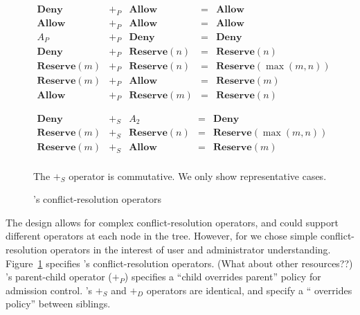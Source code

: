 \begin{figure}[t]
\begin{small}
\begin{displaymath}
\begin{array}{lclcl}
\textbf{Deny} & +_P & \textbf{Allow} & = & \textbf{Allow} \\
\textbf{Allow} & +_P & \textbf{Allow} & = & \textbf{Allow} \\
A_P & +_P & \textbf{Deny} & = & \textbf{Deny} \\
\textbf{Deny} & +_P & \textbf{Reserve}(n) & = & \textbf{Reserve}(n) \\
\textbf{Reserve}(m) & +_P & \textbf{Reserve}(n) & = & \textbf{Reserve}(\max(m,n)) \\
\textbf{Reserve}(m) & +_P & \textbf{Allow} & = & \textbf{Reserve}(m) \\
\textbf{Allow} & +_P & \textbf{Reserve}(m) & = & \textbf{Reserve}(n)
\end{array}
\end{displaymath}

\begin{displaymath}
\begin{array}{lclcl}
\textbf{Deny} & +_S & A_2 & = & \textbf{Deny} \\
\textbf{Reserve}(m) & +_S & \textbf{Reserve}(n) & = & \textbf{Reserve}(\max(m,n)) \\
\textbf{Reserve}(m) & +_S & \textbf{Allow} & = & \textbf{Reserve}(m) \\
\end{array}
\end{displaymath}
\end{small}
{\small The $+_S$ operator is commutative. We only show representative cases.}

\caption{\sys's conflict-resolution operators}
\label{f:sysconflicts}

\end{figure}

The \treelang design allows for complex
conflict-resolution operators, and could support different operators at
each node in the tree.
However, for \sys we chose simple conflict-resolution operators in the
interest of user and administrator understanding.
Figure~\ref{f:sysconflicts} specifies \sys's conflict-resolution
operators. {\color{red}(What about other resources??)}
\sys's parent-child operator ($+_P$) specifies a ``child
overrides parent'' policy for admission control. \sys's $+_S$ and $+_D$
operators are identical, and specify a `` overrides
 policy'' between siblings.

